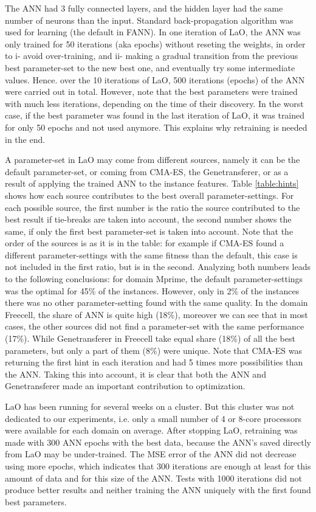 \documentclass{MYsig-alternate}
\begin{document}
The ANN had 3 fully connected layers, and the hidden layer had the same number of neurons than the input. Standard back-propagation algorithm was used for learning (the default in FANN). In one iteration of LaO, the ANN was only trained for 50 iterations (aka epochs) without reseting the weights, in order to i- avoid over-training, and ii- making a gradual transition from the previous best parameter-set to the new best one, and eventually try some intermediate values. Hence. over the 10 iterations of LaO, 500 iterations (epochs) of the ANN were carried out in total. However, note that the best parameters were trained with much less iterations, depending on the time of their discovery. In the worst case, if the best parameter was found in the last iteration of LaO, it was trained for only 50 epochs and not used anymore. This explains why retraining is needed in the end.

A parameter-set in LaO may come from different sources, namely it can be the default parameter-set, or coming from CMA-ES, the Genetransferer, or as a result of applying the trained ANN to the instance features. Table \ref{table:hints} shows how each source contributes to the best overall parameter-settings. For each possible source, the first number is the ratio the source contributed to the best result if tie-breaks are taken into account, the second number shows the same, if only the first best parameter-set is taken into account. Note that the order of the sources is as it is in the table: for example if CMA-ES found a different parameter-settings with the same fitness than the default, this case is not included in the first ratio, but is in the second. Analyzing both numbers leads to the following conclusions: for domain Mprime, the default parameter-settings was the optimal for 45\% of the instances. However, only in 2\% of the instances there was no other parameter-setting found with the same quality. In the domain Freecell, the share of ANN is quite high (18\%), moreover we can see that in most cases, the other sources did not find a parameter-set with the same performance (17\%). While Genetransferer in Freecell take equal share (18\%) of all the best parameters, but only a part of them (8\%) were unique. Note that CMA-ES was returning the first hint in each iteration and had 5 times more possibilities than the ANN. Taking this into account, it is clear that both the ANN and Genetransferer made an important contribution to optimization.

LaO has been running for several weeks on a cluster. But this cluster was not dedicated to our experiments, i.e. only a small number of 4 or 8-core processors were available for each domain on average. After stopping LaO, retraining was made with 300 ANN epochs with the best data, because the ANN's saved directly from LaO may be under-trained. The MSE error of the ANN did not decrease using more epochs, which indicates that 300 iterations are enough at least for this amount of data and for this size of the ANN. Tests with 1000 iterations did not produce better results and neither training the ANN uniquely with the first found best parameters.
\end{document}
